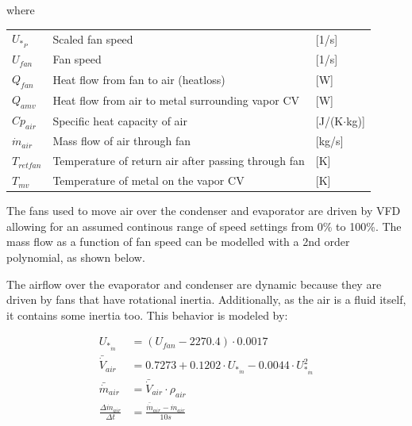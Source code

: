 where

\begin{center}
	\begin{tabular}{l p{10cm} l}
		$U_{*_P}$    & Scaled fan speed                                    & [1/\si{s}]                        \\
		$U_{fan}$       & Fan speed                                           & [1/\si{s}]                        \\
		$Q_{fan}$       & Heat flow from fan to air (heatloss)                & [\si{W}]                          \\
		$Q_{amv}$       & Heat flow from air to metal surrounding vapor CV    & [\si{W}]                          \\
		$Cp_{air}$      & Specific heat capacity of air                       & [\si{J}/(\si{K}$ \cdot $\si{kg})] \\
		$\dot{m}_{air}$ & Mass flow of air through fan                        & [\si{kg}/\si{s}]                  \\
		$T_{retfan}$    & Temperature of return air after passing through fan & [\si{K}]                          \\
		$T_{mv}$        & Temperature of metal on the vapor CV                & [\si{K}]
	\end{tabular}
\end{center}

The fans used to move air over the condenser and evaporator are driven by VFD allowing for an assumed continous range of speed settings from 0\% to 100\%. The mass flow as a function of fan speed can be modelled with a 2nd order polynomial, as shown below.

The airflow over the evaporator and condenser are dynamic because they are driven by fans that have rotational inertia. Additionally, as the air is a fluid itself, it contains some inertia too. This behavior is modeled by:

\begin{align}
	U_{*_{\dot{m}}} & = (U_{fan} - 2270.4)\cdot 0.0017 \\
	\bar{\dot{V}}_{air} & = 0.7273 + 0.1202 \cdot 	U_{*_{\dot{m}}}  -0.0044 \cdot 	U_{*_{\dot{m}}}^2\\
	\bar{\dot{m}}_{air} & = \bar{\dot{V}}_{air} \cdot \rho_{air}  \label{eq:Evaporator_FanAirInstantMassFlow}\\
	\frac{\Delta \dot{m}_{air}}{\Delta t} & = \frac{\bar{\dot{m}}_{air}  - \dot{m}_{air}} {10s} \label{eq:Evaporator_FanAirRateOfChange}
\end{align}

